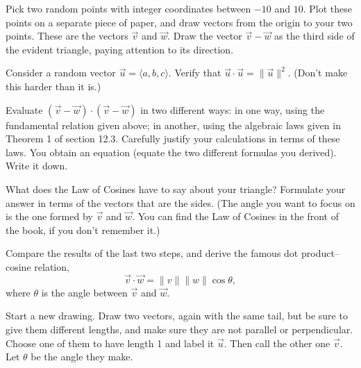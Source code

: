 \documentclass[12pt]{exam}
\begin{document}
\begin{questions}

\question Pick two random points with integer coordinates between $-10$ and $10$. Plot these points on a separate piece of paper, and draw vectors from the origin to your two points. These are the vectors $\vec{v}$ and $\vec{w}$. Draw the vector $\vec{v} - \vec{w}$ as the third side of the evident triangle, paying attention to its direction.


\question Consider a random vector $\vec{u} = \langle a, b, c \rangle$. Verify that $\vec{u} \cdot \vec{u} = \lVert \vec{u} \rVert^2$. (Don't make this harder than it is.)




\question Evaluate $(\vec{v} - \vec{w}) \cdot (\vec{v} - \vec{w})$ in two different ways: in one way, using the fundamental relation given above; in another, using the algebraic laws given in Theorem 1 of section 12.3. Carefully justify your calculations in terms of these laws. You obtain an equation (equate the two different formulas you derived). Write it down.


\question What does the Law of Cosines have to say about your triangle? Formulate your answer in terms of the vectors that are the sides. (The angle you want to focus on is the one formed by $\vec{v}$ and $\vec{w}$. You can find the Law of Cosines in the front of the book, if you don't remember it.)


\question Compare the results of the last two steps, and derive the famous dot product--cosine relation,
$$ \vec{v} \cdot \vec{w} = \lVert v \rVert \lVert w \rVert \cos{\theta},$$
where $\theta$ is the angle between $\vec{v}$ and $\vec{w}$.


\newpage


\question Start a new drawing. Draw two vectors, again with the same tail, but be sure to give them different lengths, and make sure they are not parallel or perpendicular. Choose one of them to have length 1 and label it $\vec{u}$. Then call the other one $\vec{v}$. Let $\theta$ be the angle they make.


\end{questions}
\end{document}
